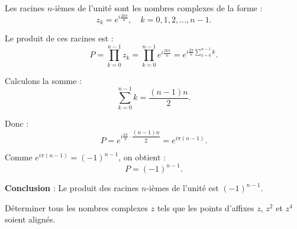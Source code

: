 \documentclass[a4paper,12pt]{article}
\begin{document}
\begin{solutionbox}
Les racines \( n \)-ièmes de l'unité sont les nombres complexes de la forme :
\[
z_k = e^{i\frac{2k\pi}{n}}, \quad k = 0, 1, 2, \dots, n-1.
\]

Le produit de ces racines est :
\[
P = \prod_{k=0}^{n-1} z_k = \prod_{k=0}^{n-1} e^{i\frac{2k\pi}{n}} = e^{i\frac{2\pi}{n} \sum_{k=0}^{n-1} k}.
\]

Calculons la somme :
\[
\sum_{k=0}^{n-1} k = \dfrac{(n-1)n}{2}.
\]

Donc :
\[
P = e^{i\frac{2\pi}{n} \cdot \dfrac{(n-1)n}{2}} = e^{i\pi(n-1)}.
\]

Comme \( e^{i\pi(n-1)} = (-1)^{n-1} \), on obtient :
\[
P = (-1)^{n-1}.
\]

\textbf{Conclusion} : Le produit des racines \( n \)-ièmes de l'unité est \( (-1)^{n-1} \).
\end{solutionbox}

\begin{tcolorbox}[title={Exercice 12 - {[}Calculer, Chercher{]}}]
Déterminer tous les nombres complexes \( z \) tels que les points d’affixes \( z \), \( z^2 \) et \( z^4 \) soient alignés.
\end{tcolorbox}
\end{document}
